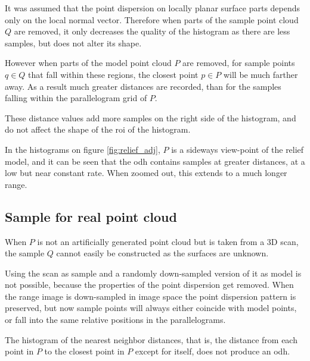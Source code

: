 It was assumed that the point dispersion on locally planar surface parts depends only on the local normal vector. Therefore when parts of the sample point cloud $Q$ are removed, it only decreases the quality of the histogram as there are less samples, but does not alter its shape.

However when parts of the model point cloud $P$ are removed, for sample points $q \in Q$ that fall within these regions, the closest point $p \in P$ will be much farther away. As a result much greater distances are recorded, than for the samples falling within the parallelogram grid of $P$.

These distance values add more samples on the right side of the histogram, and do not affect the shape of the \gls{roi} of the histogram.

In the histograms on figure \ref{fig:relief_adj}, $P$ is a sideways view-point of the relief model, and it can be seen that the \gls{odh} contains samples at greater distances, at a low but near constant rate. When zoomed out, this extends to a much longer range.


\subsection{Sample for real point cloud}
When $P$ is not an artificially generated point cloud but is taken from a 3D scan, the sample $Q$ cannot easily be constructed as the surfaces are unknown.

Using the scan as sample and a randomly down-sampled version of it as model is not possible, because the properties of the point dispersion get removed. When the range image is down-sampled in image space the point dispersion pattern is preserved, but now sample points will always either coincide with model points, or fall into the same relative positions in the parallelograms.

The histogram of the nearest neighbor distances, that is, the distance from each point in $P$ to the closest point in $P$ except for itself, does not produce an \gls{odh}.

